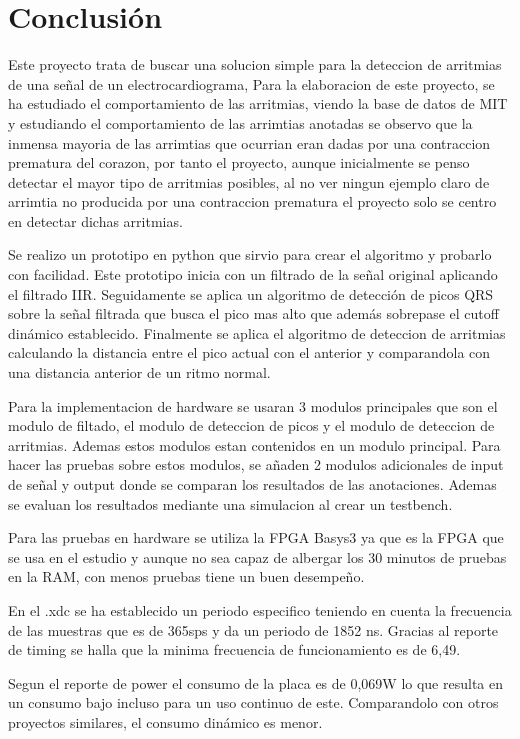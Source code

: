 \chapter{Conclusión}
Este proyecto trata de buscar una solucion simple para la deteccion de 
arritmias de una señal de un electrocardiograma, Para la elaboracion de este proyecto, 
se ha estudiado el comportamiento de las arritmias, viendo la base de datos de MIT y estudiando
el comportamiento de las arrimtias anotadas se observo que la inmensa mayoria de las arrimtias 
que ocurrian eran dadas por una contraccion prematura del corazon, por tanto el proyecto, aunque
inicialmente se penso detectar el mayor tipo de arritmias posibles, al no ver ningun ejemplo claro
de arrimtia no producida por una contraccion prematura el proyecto solo se centro en detectar dichas arritmias.

Se realizo un prototipo en python que sirvio para crear el algoritmo y probarlo con facilidad. Este prototipo inicia
con un filtrado de la señal original aplicando el filtrado IIR. Seguidamente se aplica un algoritmo de detección de 
picos QRS sobre la señal filtrada que busca el pico mas alto que además sobrepase el cutoff dinámico establecido. Finalmente
se aplica el algoritmo de deteccion de arritmias calculando la distancia entre el pico actual con el anterior y comparandola con una
distancia anterior de un ritmo normal.

Para la implementacion de hardware se usaran 3 modulos principales que son el modulo de filtado, el modulo de deteccion de picos 
y el modulo de deteccion de arritmias. Ademas estos modulos estan contenidos en un modulo principal. Para hacer las pruebas sobre
estos modulos, se añaden 2 modulos adicionales de input de señal y output donde se comparan los resultados de las anotaciones. Ademas 
se evaluan los resultados mediante una simulacion al crear un testbench.

Para las pruebas en hardware se utiliza la FPGA Basys3 ya que es la FPGA que se usa en el estudio y aunque no sea capaz de 
albergar los 30 minutos de pruebas en la RAM, con menos pruebas tiene un buen desempeño.

En el .xdc se ha establecido un periodo especifico teniendo en cuenta la frecuencia de las muestras que es de 365sps y da un periodo 
de 1852 ns. Gracias al reporte de timing se halla que la minima frecuencia de funcionamiento es de 6,49.

Segun el reporte de power el consumo de la placa es de 0,069W lo que resulta en un consumo bajo incluso para un uso continuo de este.
Comparandolo con otros proyectos similares, el consumo dinámico es menor.

